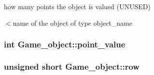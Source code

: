 how many points the object is valued (U\+N\+U\+S\+ED) 

$<$name of the object of type object\+\_\+name 
\subsubsection[{\texorpdfstring{point\+\_\+value}{point_value}}]{\setlength{\rightskip}{0pt plus 5cm}int Game\+\_\+object\+::point\+\_\+value}\hypertarget{group__object_gaa3e8af9c364161ddf47359bba651e9cf}{}\label{group__object_gaa3e8af9c364161ddf47359bba651e9cf}
\subsubsection[{\texorpdfstring{row}{row}}]{\setlength{\rightskip}{0pt plus 5cm}unsigned short Game\+\_\+object\+::row}\hypertarget{group__object_ga41a0b70059db5a8364cb00caed5f7860}{}\label{group__object_ga41a0b70059db5a8364cb00caed5f7860}
